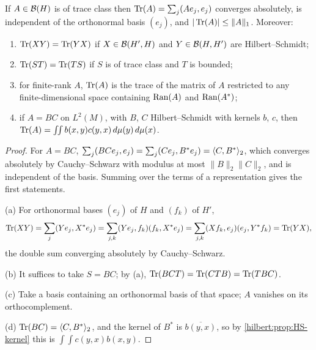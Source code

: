\begin{proposition}\label{hilbert:prop:trace}
If $A\in\mathcal{B}(H)$ is of trace class then $\operatorname{Tr}(A)=\sum_j( Ae_j, e_j)$ converges absolutely, is
independent of the orthonormal basis $(e_j)$, and $|\operatorname{Tr}(A)|\le\|A\|_1$. Moreover:
\begin{enumerate}[label=\textup{(\alph*)}]
\item $\operatorname{Tr}(XY)=\operatorname{Tr}(YX)$ if $X\in\mathcal{B}(H',H)$ and $Y\in\mathcal{B}(H,H')$ are Hilbert--Schmidt;
\item $\operatorname{Tr}(ST)=\operatorname{Tr}(TS)$ if $S$ is of trace class and $T$ is bounded;
\item for finite-rank $A$, $\operatorname{Tr}(A)$ is the trace of the matrix of $A$ restricted to any
finite-dimensional space containing $\operatorname{Ran}(A)$ and $\operatorname{Ran}(A^*)$;
\item if $A=BC$ on $L^2(M)$, with $B$, $C$ Hilbert--Schmidt with kernels $b$, $c$, then
$\operatorname{Tr}(A)=\int\!\!\int b(x,y)c(y,x)\,d\mu(y)\,d\mu(x)$.
\end{enumerate}
\end{proposition}
\begin{proof}
For $A=BC$, $\sum_j( BCe_j, e_j)=\sum_j( Ce_j, B^*e_j)=\langle C,B^*\rangle_2$, which converges
absolutely by Cauchy--Schwarz with modulus at most $\|B\|_2\|C\|_2$, and is independent of the basis.
Summing over the terms of a representation gives the first statements.

(a) For orthonormal bases $(e_j)$ of $H$ and $(f_k)$ of $H'$,
\begin{equation*}
\operatorname{Tr}(XY)=\sum_j( Ye_j, X^*e_j)=\sum_{j,k}( Ye_j, f_k)( f_k, X^*e_j)
=\sum_{j,k}( Xf_k, e_j)( e_j, Y^*f_k)=\operatorname{Tr}(YX),
\end{equation*}
the double sum converging absolutely by Cauchy--Schwarz.

(b) It suffices to take $S=BC$; by (a), $\operatorname{Tr}(BCT)=\operatorname{Tr}(CTB)=\operatorname{Tr}(TBC)$.

(c) Take a basis containing an orthonormal basis of that space; $A$ vanishes on its
orthocomplement.

(d) $\operatorname{Tr}(BC)=\langle C,B^*\rangle_2$, and the kernel of $B^*$ is $\overline{b(y,x)}$, so by
\cref{hilbert:prop:HS-kernel} this is $\int\!\!\int c(y,x)b(x,y)$.
\end{proof}

